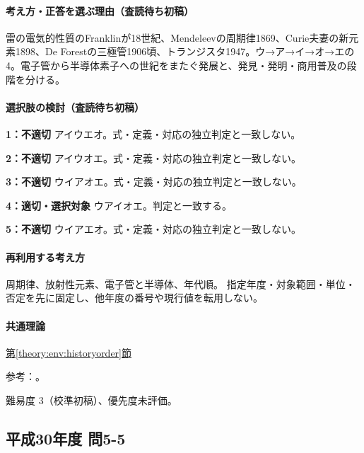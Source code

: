 \paragraph{考え方・正答を選ぶ理由（査読待ち初稿）} 雷の電気的性質のFranklinが18世紀、Mendeleevの周期律1869、Curie夫妻の新元素1898、De Forestの三極管1906頃、トランジスタ1947。ウ→ア→イ→オ→エの4。電子管から半導体素子への世紀をまたぐ発展と、発見・発明・商用普及の段階を分ける。

\paragraph{選択肢の検討（査読待ち初稿）}\mbox{}\par

\noindent\textbf{1：不適切} アイウエオ。式・定義・対応の独立判定と一致しない。\par

\noindent\textbf{2：不適切} アイウオエ。式・定義・対応の独立判定と一致しない。\par

\noindent\textbf{3：不適切} ウイアオエ。式・定義・対応の独立判定と一致しない。\par

\noindent\textbf{4：適切・選択対象} ウアイオエ。判定と一致する。\par

\noindent\textbf{5：不適切} ウイアエオ。式・定義・対応の独立判定と一致しない。\par

\paragraph{再利用する考え方} 周期律、放射性元素、電子管と半導体、年代順。 指定年度・対象範囲・単位・否定を先に固定し、他年度の番号や現行値を転用しない。

\paragraph{共通理論} \hyperref[theory:env:historyorder]{第\ref*{theory:env:historyorder}節}

\par 参考：\cite{env58_curie}。

\par 難易度 3（校準初稿）、優先度未評価。

\subsection{平成30年度 問5-5}
\label{q:h30-reg-basic-5-5}

